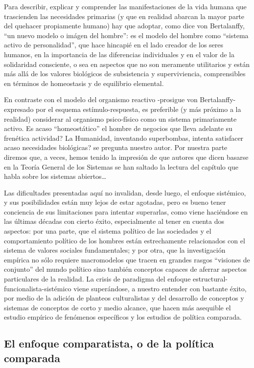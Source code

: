 \documentclass[
]{book}
\begin{document}
Para describir, explicar y comprender las manifestaciones de la vida humana que trascienden las necesidades primarias (y que en realidad abarcan la mayor parte del quehacer propiamente humano) hay que adoptar, como dice von Bertalanffy, ``un nuevo modelo o imágen del hombre'': es el modelo del hombre como ``sistema activo de personalidad'', que hace hincapié en el lado creador de los seres humanos, en la importancia de las diferencias individuales y en el valor de la solidaridad consciente, o sea en aspectos que no son meramente utilitarios y están más allá de los valores biológicos de subsistencia y superviviencia, comprensibles en términos de homeostasis y de equilibrio elemental.

En contraste con el modelo del organismo reactivo -prosigue von Bertalanffy- expresado por el esquema estímulo-respuesta, es preferible (y más próximo a la realidad) considerar al organismo psico-físico como un sistema primariamente activo. Es acaso ``homeostático'' el hombre de negocios que lleva adelante su frenética actividad? La Humanidad, inventando superbombas, intenta satisfacer acaso necesidades biológicas? se pregunta nuestro autor. Por nuestra parte diremos que, a veces, hemos tenido la impresión de que autores que dicen basarse en la Teoría General de los Sistemas se han saltado la lectura del capítulo que habla sobre los sistemas abiertos\ldots{}

Las dificultades presentadas aquí no invalidan, desde luego, el enfoque sistémico, y sus posibilidades están muy lejos de estar agotadas, pero es bueno tener conciencia de sus limitaciones para intentar superarlas, como viene haciéndose en las últimas décadas con cierto éxito, especialmente al tener en cuenta dos aspectos: por una parte, que el sistema político de las sociedades y el comportamiento político de los hombres están estrechamente relacionados con el sistema de valores sociales fundamentales; y por otra, que la investigación empírica no sólo requiere macromodelos que tracen en grandes rasgos ``visiones de conjunto'' del mundo político sino también conceptos capaces de aferrar aspectos particulares de la realidad. La crisis de paradigma del enfoque estructural-funcionalista-sistémico viene superándose, a nuestro entender con bastante éxito, por medio de la adición de planteos culturalistas y del desarrollo de conceptos y sistemas de conceptos de corto y medio alcance, que hacen más asequible el estudio empírico de fenómenos específicos y los estudios de política comparada.

\hypertarget{el-enfoque-comparatista-o-de-la-poluxedtica-comparada}{%
\subsection*{El enfoque comparatista, o de la política comparada}\label{el-enfoque-comparatista-o-de-la-poluxedtica-comparada}}
\end{document}
